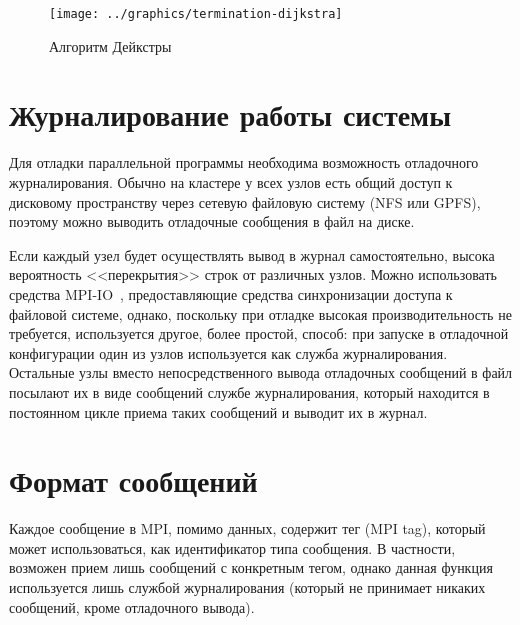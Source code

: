 \begin{figure}[htb]
  \centering
  \texttt{[image: ../graphics/termination-dijkstra]}  
  \caption{Алгоритм Дейкстры}
\label{fig:termination-dijkstra}
\end{figure}

\section{Журналирование работы системы}
\label{sec:mpi-logging}

Для отладки параллельной программы необходима возможность отладочного журналирования.
Обычно на кластере у всех узлов есть общий доступ к дисковому пространству через сетевую
файловую систему (NFS или GPFS), поэтому можно выводить отладочные сообщения в файл на
диске.

Если каждый узел будет осуществлять вывод в журнал самостоятельно, высока вероятность
<<перекрытия>> строк от различных узлов. Можно использовать средства MPI-IO~\cite{MPI},
предоставляющие средства синхронизации доступа к файловой системе, однако, поскольку при
отладке высокая производительность не требуется, используется другое, более простой,
способ: при запуске в отладочной конфигурации один из узлов используется как служба
журналирования. Остальные узлы вместо непосредственного вывода отладочных сообщений в файл
посылают их в виде сообщений службе журналирования, который находится в постоянном цикле
приема таких сообщений и выводит их в журнал.

\section{Формат сообщений}
\label{sec:message-format}

Каждое сообщение в MPI, помимо данных, содержит тег (MPI tag), который может
использоваться, как идентификатор типа сообщения. В частности, возможен прием лишь
сообщений с конкретным тегом, однако данная функция используется лишь службой
журналирования (который не принимает никаких сообщений, кроме отладочного вывода).

